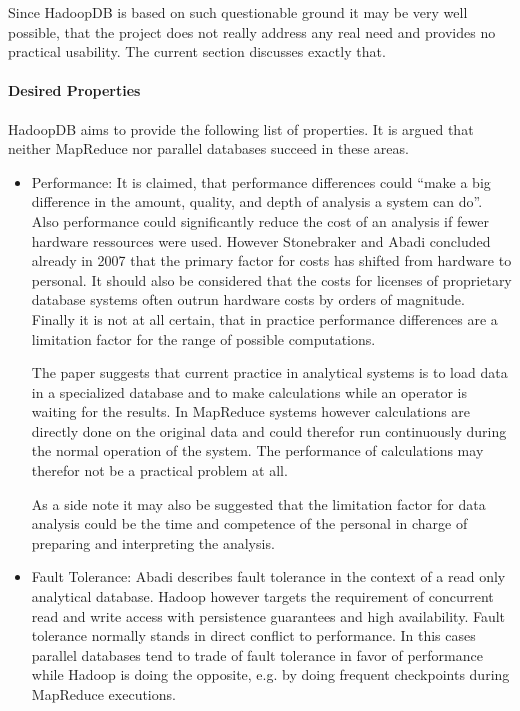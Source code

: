 \documentclass[12pt,a4paper]{scrartcl}		%
\begin{document}
Since HadoopDB is based on such questionable ground it may be very well possible, that the project does not really address any real need and provides no practical usability. The current section discusses exactly that.

\paragraph{Desired Properties}
HadoopDB aims to provide the following list of properties. It is argued that neither MapReduce nor parallel databases succeed in these areas.

\begin{itemize}
\item Performance: It is claimed, that performance differences could ``make a big difference in the amount, quality, and depth of analysis a system can do''. Also performance could significantly reduce the cost of an analysis if fewer hardware ressources were used. However Stonebraker and Abadi concluded already in 2007 that the primary factor for costs has shifted from hardware to personal.\cite[2.5 No Knobs]{sto07} It should also be considered that the costs for licenses of proprietary database systems often outrun hardware costs by orders of magnitude. Finally it is not at all certain, that in practice performance differences are a limitation factor for the range of possible computations.

The paper suggests that current practice in analytical systems is to load data in a specialized database and to make calculations while an operator is waiting for the results. In MapReduce systems however calculations are directly done on the original data and could therefor run continuously during the normal operation of the system. The performance of calculations may therefor not be a practical problem at all.

As a side note it may also be suggested that the limitation factor for data analysis could be the time and competence of the personal in charge of preparing and interpreting the analysis.

\item Fault Tolerance: Abadi describes fault tolerance in the context of a read only analytical database. Hadoop however targets the requirement of concurrent read and write access with persistence guarantees and high availability. Fault tolerance normally stands in direct conflict to performance. In this cases parallel databases tend to trade of fault tolerance in favor of performance while Hadoop is doing the opposite, e.g. by doing frequent checkpoints during MapReduce executions.


\end{itemize}
\end{document}
